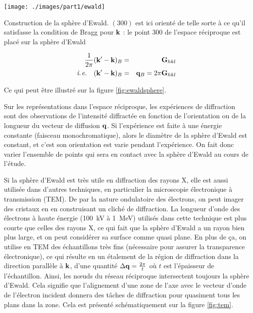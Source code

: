 \begin{marginfigure}
    \texttt{[image: ./images/part1/ewald]}
    \caption{Construction de la sphère d'Ewald. $(300)$ est ici orienté de telle sorte à ce qu'il satisfasse la condition de Bragg pour $\mathbf{k}$ : le point $300$ de l'espace réciproque est placé sur la sphère d'Ewald}
    \label{fig:ewaldsphere}
\end{marginfigure}
\begin{eqnarray}
    \frac{1}{2\pi} (\mathbf{k'-k})_B & = & \mathbf{G}_{hkl}\\
    \textit{i.\hspace{1pt}{}e.}\quad(\mathbf{k'-k})_B & = & \mathbf{q}_B  =  2 \pi \mathbf{G}_{hkl}
\end{eqnarray}

Ce qui peut être illustré sur la figure \ref{fig:ewaldsphere}.

Sur les représentations dans l'espace réciproque, les expériences de diffraction
sont des observations de l'intensité diffractée en fonction de l'orientation
ou de la longueur du vecteur de diffusion $\mathbf{q}$. Si l'expérience est faite
à une énergie constante (faisceau monochromatique), alors le diamètre de la
sphère d'Ewald est constant, et c'est son orientation est varie pendant l'expérience. On fait donc varier l'ensemble de points qui sera en contact avec la sphère d'Ewald au cours de l'étude.

Si la sphère d'Ewald est très utile en diffraction des rayons X, elle est aussi utilisée dans d'autres techniques, en particulier la microscopie électronique à transmission (TEM). De par la nature ondulatoire des électrons, on peut imager des cristaux en en construisant un cliché de diffraction. La longueur d'onde des électrons à haute énergie (\SI{100}{\kilo\volt} à \SI{1}{\mega\electronvolt}) utilisés dans cette technique est plus courte que celles des rayons X, ce qui fait que la sphère d'Ewald a un rayon bien plus large, et on peut considérer sa surface comme quasi plane. En plus de ça, on utilise en TEM des échantillons très fins (nécessaire pour assurer la transparence électronique), ce qui résulte en un étalement de la région de diffraction dans la direction parallèle à $\mathbf{k}$, d'une quantité $\Delta \mathbf{q} = \frac{2\pi}{t}$ où $t$ est l'épaisseur de l'échantillon. Ainsi, les nœuds
du réseau réciproque intersectent toujours la sphère d'Ewald. Cela signifie que
l'alignement d'une zone de l'axe avec le vecteur d'onde de l'électron
incident donnera des tâches de diffraction pour quasiment tous les plans dans la
zone. Cela est présenté schématiquement sur la figure \ref{fig:tem}.

